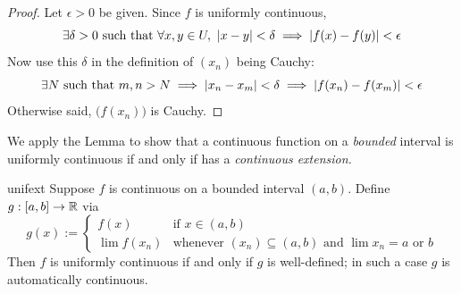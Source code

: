 \begin{proof}
	Let $\epsilon>0$ be given. Since $f$ is uniformly continuous,
	\[\exists\delta>0\text{ such that }\forall x,y\in U,\ \left| x-y\right|<\delta\implies\left| f(x)-f(y)\right|<\epsilon\]
	Now use this $\delta$ in the definition of $(x_n)$ being Cauchy:\footnotemark
	\[\exists N\text{ such that }m,n>N\implies\left| x_n-x_m\right|<\delta\implies\left| f(x_n)-f(x_m)\right|<\epsilon\]
	Otherwise said, $\bigl(f(x_n)\bigr)$ is Cauchy.
\end{proof}
\vspace{-8pt}


\goodbreak

We apply the Lemma to show that a continuous function on a \emph{bounded} interval is uniformly continuous if and only if has a \emph{continuous extension.}

\begin{thm}{}{unifext}
	Suppose $f$ is continuous on a bounded interval $(a,b)$. Define $g:[a,b]\to \mathbb{R}$ via
	\[
		g(x):=\begin{cases}
		f(x)&\text{if }x\in (a,b)\\
		\lim f(x_n)&\text{whenever $(x_n)\subseteq (a,b)$ and $\lim x_n=a$ or $b$}
		\end{cases}
	\]
	Then $f$ is uniformly continuous if and only if $g$ is well-defined; in such a case $g$ is automatically continuous.
\end{thm}

